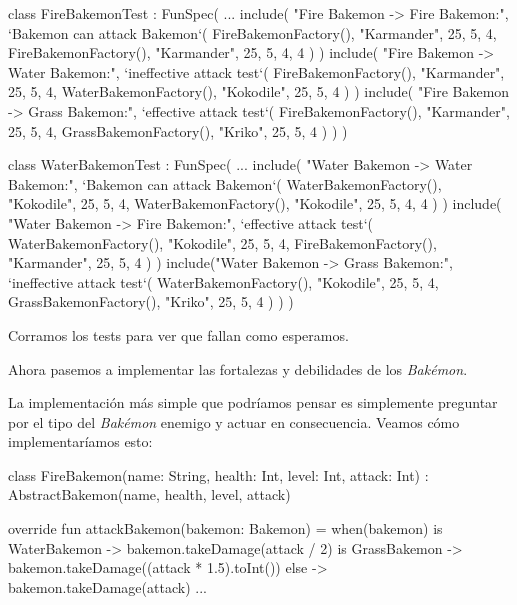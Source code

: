   \begin{kotlin}
    class FireBakemonTest : FunSpec({
      ...
      include(
        "Fire Bakemon -> Fire Bakemon:",
        `Bakemon can attack Bakemon`(
          FireBakemonFactory(), "Karmander", 25, 5, 4,
          FireBakemonFactory(), "Karmander", 25, 5, 4, 4
        )
      )
      include(
        "Fire Bakemon -> Water Bakemon:",
        `ineffective attack test`(
          FireBakemonFactory(), "Karmander", 25, 5, 4,
          WaterBakemonFactory(), "Kokodile", 25, 5, 4
        )
      )
      include(
        "Fire Bakemon -> Grass Bakemon:",
        `effective attack test`(
          FireBakemonFactory(), "Karmander", 25, 5, 4,
          GrassBakemonFactory(), "Kriko", 25, 5, 4
        )
      )
    })
  \end{kotlin}

  \begin{kotlin}
    class WaterBakemonTest : FunSpec({
      ...
      include(
        "Water Bakemon -> Water Bakemon:",
        `Bakemon can attack Bakemon`(
          WaterBakemonFactory(), "Kokodile", 25, 5, 4,
          WaterBakemonFactory(), "Kokodile", 25, 5, 4, 4
        )
      )
      include(
        "Water Bakemon -> Fire Bakemon:",
        `effective attack test`(
          WaterBakemonFactory(), "Kokodile", 25, 5, 4,
          FireBakemonFactory(), "Karmander", 25, 5, 4
        )
      )
      include("Water Bakemon -> Grass Bakemon:",
        `ineffective attack test`(
          WaterBakemonFactory(), "Kokodile", 25, 5, 4,
          GrassBakemonFactory(), "Kriko", 25, 5, 4
        )
      )
    })
  \end{kotlin}

  Corramos los tests para ver que fallan como esperamos.

  Ahora pasemos a implementar las fortalezas y debilidades de los \textit{Bakémon}.

  La implementación más simple que podríamos pensar es simplemente preguntar por el tipo del
  \textit{Bakémon} enemigo y actuar en consecuencia.
  Veamos cómo implementaríamos esto:

  \begin{kotlin}
    class FireBakemon(name: String, health: Int, level: Int, attack: Int) :
        AbstractBakemon(name, health, level, attack) {

      override fun attackBakemon(bakemon: Bakemon) = when(bakemon) {
        is WaterBakemon -> bakemon.takeDamage(attack / 2)
        is GrassBakemon -> bakemon.takeDamage((attack * 1.5).toInt())
        else -> bakemon.takeDamage(attack)
      }
      ...
    }
  \end{kotlin}

